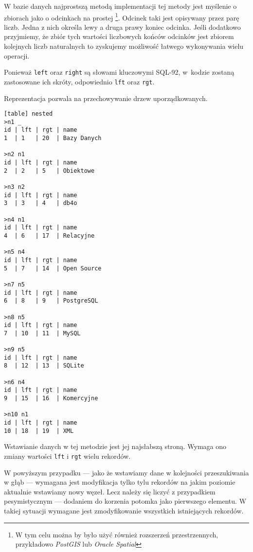 W bazie danych najprostszą metodą implementacji tej metody jest myślenie o zbiorach jako o odcinkach na prostej%
\footnote{W tym celu można by było użyć również rozszerzeń przestrzennych, przykładowo \emph{PostGIS} lub \emph{Oracle Spatial}}.
Odcinek taki jest opisywany przez parę liczb.
Jedna z nich określa lewy a druga prawy koniec odcinka.
Jeśli dodatkowo przyjmiemy, że zbiór tych wartości liczbowych końców odcinków
jest zbiorem kolejnych liczb naturalnych to zyskujemy możliwość łatwego wykonywania wielu operacji.

Ponieważ \texttt{left} oraz \texttt{right} są słowami kluczowymi SQL-92,
w~kodzie zostaną zastosowane ich skróty, odpowiednio \texttt{lft} oraz \texttt{rgt}.

Reprezentacja pozwala na przechowywanie drzew uporządkowanych.


\begin{verbatim}[table] nested
>n1 _
id | lft | rgt | name
1  | 1   | 20  | Bazy Danych

>n2 n1
id | lft | rgt | name
2  | 2   | 5   | Obiektowe

>n3 n2
id | lft | rgt | name
3  | 3   | 4   | db4o

>n4 n1
id | lft | rgt | name
4  | 6   | 17  | Relacyjne

>n5 n4
id | lft | rgt | name
5  | 7   | 14  | Open Source

>n7 n5
id | lft | rgt | name
6  | 8   | 9   | PostgreSQL

>n8 n5
id | lft | rgt | name
7  | 10  | 11  | MySQL

>n9 n5
id | lft | rgt | name
8  | 12  | 13  | SQLite

>n6 n4
id | lft | rgt | name
9  | 15  | 16  | Komercyjne

>n10 n1
id | lft | rgt | name
10 | 18  | 19  | XML

\end{verbatim}






Wstawianie danych w tej metodzie jest jej najsłabszą stroną.
Wymaga ono zmiany wartości \texttt{lft} i \texttt{rgt} wielu rekordów.

W powyższym przypadku
--- jako że wstawiamy dane w kolejności przeszukiwania w głąb ---
wymagana jest modyfikacja tylko tylu rekordów na jakim poziomie aktualnie wstawiamy nowy węzeł.
Lecz należy się liczyć z przypadkiem pesymistycznym --- dodaniem do korzenia potomka jako pierwszego elementu.
W takiej sytuacji wymagane jest zmodyfikowanie wszystkich istniejących rekordów.

